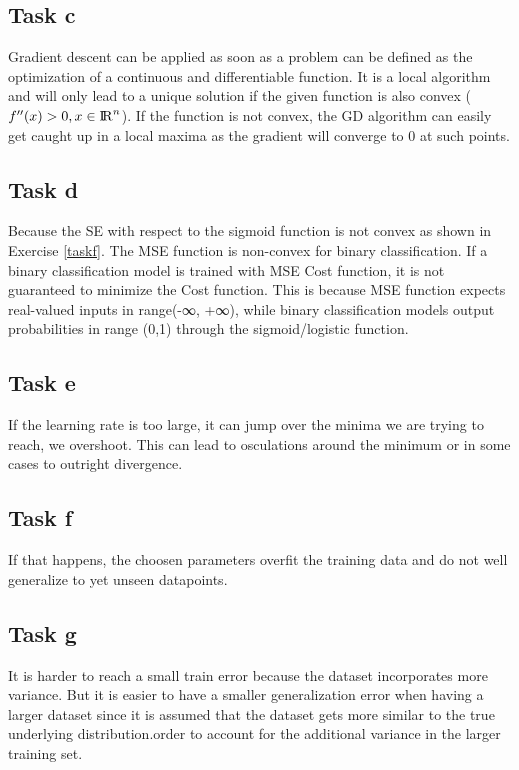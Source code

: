 \documentclass[onecolumn]{article}
\begin{document}
\subsection{Task c}
Gradient descent can be applied as soon as a problem can be defined as the optimization of a continuous and differentiable function. It is a local algorithm and will only lead to a unique solution if the given function is also convex ($f^{\prime\prime}(x)>0, x \in {\rm I\!R}^n$). If the function is not convex, the GD algorithm can easily get caught up in a local maxima as the gradient will converge to $0$ at such points.

\subsection{Task d}
Because the SE with respect to the sigmoid function is not convex as shown in Exercise \ref{taskf}.
The MSE function is non-convex for binary classification. If a binary classification model
is trained with MSE Cost function, it is not guaranteed to minimize the Cost function.
This is because MSE function expects real-valued inputs in range(-∞, +∞), while binary
classification models output probabilities in range (0,1) through the sigmoid/logistic
function.

\subsection{Task e}
If the learning rate is too large, it can jump over the minima we are trying to reach, we
overshoot. This can lead to osculations around the minimum or in some cases to outright
divergence.

\subsection{Task f}
If that happens, the choosen parameters overfit the training data and do not well generalize to yet unseen datapoints.

\subsection{Task g}
It is harder to reach a small train error because the dataset incorporates more variance. But it is easier to have a smaller generalization error when having a larger dataset since it is assumed that the dataset gets more similar to the true underlying distribution.order to account for the additional variance in the larger training set.
\end{document}
